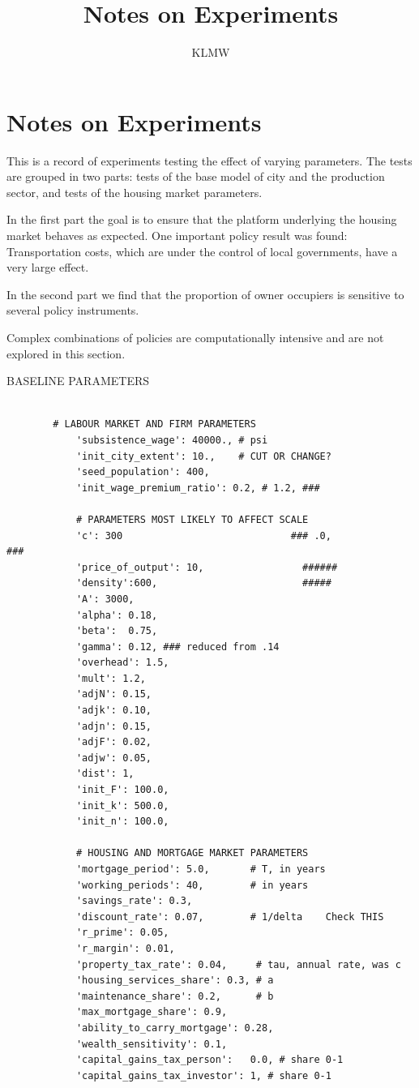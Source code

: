 \documentclass{article}
\title{Notes on Experiments}
\author{KLMW}
\begin{document}
\maketitle
\tableofcontents \newpage
\section{Notes on Experiments}
This is a record of experiments testing the effect of  varying parameters. The tests are grouped in two parts: tests of the base model of city and the production sector, and tests of the housing market parameters. 

In the first part the goal is to ensure that the platform underlying the housing market behaves as expected. One important policy result was found: Transportation costs, which are under the control of local governments, have a very large effect.

In the second part we find that the proportion of owner occupiers is sensitive to  several policy instruments. 

Complex combinations of policies are computationally  intensive and are not explored in this section.

\vspace{.5cm}

{\tiny
BASELINE PARAMETERS
\begin{verbatim}

        # LABOUR MARKET AND FIRM PARAMETERS
            'subsistence_wage': 40000., # psi
            'init_city_extent': 10.,    # CUT OR CHANGE?
            'seed_population': 400,
            'init_wage_premium_ratio': 0.2, # 1.2, ###

            # PARAMETERS MOST LIKELY TO AFFECT SCALE
            'c': 300                             ### .0,                            ###
            'price_of_output': 10,                 ######
            'density':600,                         #####
            'A': 3000,
            'alpha': 0.18,
            'beta':  0.75,
            'gamma': 0.12, ### reduced from .14
            'overhead': 1.5,
            'mult': 1.2,
            'adjN': 0.15,
            'adjk': 0.10,
            'adjn': 0.15,
            'adjF': 0.02,
            'adjw': 0.05, 
            'dist': 1, 
            'init_F': 100.0,
            'init_k': 500.0,
            'init_n': 100.0,

            # HOUSING AND MORTGAGE MARKET PARAMETERS
            'mortgage_period': 5.0,       # T, in years
            'working_periods': 40,        # in years
            'savings_rate': 0.3,
            'discount_rate': 0.07,        # 1/delta    Check THIS
            'r_prime': 0.05,
            'r_margin': 0.01,
            'property_tax_rate': 0.04,     # tau, annual rate, was c
            'housing_services_share': 0.3, # a
            'maintenance_share': 0.2,      # b
            'max_mortgage_share': 0.9,
            'ability_to_carry_mortgage': 0.28,
            'wealth_sensitivity': 0.1,
            'capital_gains_tax_person':   0.0, # share 0-1
            'capital_gains_tax_investor': 1, # share 0-1
    
\end{verbatim}
}
\newpage
\end{document}
